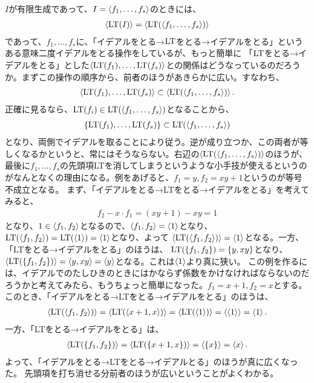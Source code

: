 \documentclass[9pt]{ltjsarticle}
\begin{document}
$I$が有限生成であって、$I=\gen{f_1,\dots,f_s}$のときには、
\begin{align}
  \gen{\LT(I)} = \gen{\LT(\gen{f_1,\dots,f_s})}
\end{align}
であって、$f_1,\dots,f_s$に、「イデアルをとる→$\LT$をとる→イデアルをとる」という
ある意味二度イデアルをとる操作をしているが、もっと簡単に
「$\LT$をとる→イデアルをとる」とした$\gen{\LT(f_1),\dots,\LT(f_s)}$との関係はどうなっているのだろうか。まずこの操作の順序から、前者のほうがあきらかに広い。すなわち、
\begin{align}
  \gen{\LT(f_1),\dots,\LT(f_s)} \subset \gen{\LT(\gen{f_1,\dots,f_s})}.
\end{align}
正確に見るなら、$\LT(f_i) \in \LT(\gen{f_1,\dots,f_s})$となることから、
\begin{align}
  \set{\LT(f_1),\dots,\LT(f_s)} \subset \LT(\gen{f_1,\dots,f_s})
\end{align}
となり、両側でイデアルを取ることにより従う。逆が成り立つか、この両者が等しくなるかというと、常にはそうならない。右辺の$\gen{\LT(\gen{f_1,\dots,f_s})}$のほうが、
最後に$f_1,\dots,f_s$の先頭項LTを消してしまうというような小手技が使えるというのがなんとなくの理由になる。例をあげると、$f_1 = y, f_2 = xy+1$というのが等号不成立となる。
まず、「イデアルをとる→LTをとる→イデアルをとる」を考えてみると、
\begin{align}
  f_2 - x\cdot f_1 = (xy+1) - xy = 1
\end{align}
となり、$1\in \gen{f_1, f_2}$となるので、$\gen{f_1,f_2} = \gen{1}$となり、
$\LT(\gen{f_1,f_2}) = \LT(\gen{1}) = \gen{1}$となり、よって
$\gen{\LT(\gen{f_1,f_2})} = \gen{1}$となる。一方、「LTをとる→イデアルをとる」のほうは、
$\LT(\set{f_1,f_2}) = \set{y,xy}$となり、$\gen{\LT(\set{f_1,f_2})} = \gen{y,xy} = \gen{y}$となる。これは$\gen{1}$より真に狭い。
この例を作るには、イデアルでのたしひきのときにはかならず係数をかけなければならないのだろうかと考えてみたら、もうちょっと簡単になった。$f_1 = x+1,f_2 = x$とする。
このとき、「イデアルをとる→LTをとる→イデアルをとる」のほうは、
\begin{align}
  \gen{\LT(\gen{f_1,f_2})} = \gen{\LT(\gen{x+1,x})}
  =
  \gen{\LT(\gen{1})}
  =
  \gen{\gen{1}}
  =
  \gen{1}.
\end{align}
一方、「LTをとる→イデアルをとる」は、
\begin{align}
  \gen{\LT(\set{f_1,f_2})}
  =
  \gen{\LT(\set{x+1,x})}
  =
  \gen{\set{x}}
  =
  \gen{x}.
\end{align}
よって、「イデアルをとる→LTをとる→イデアルとる」のほうが真に広くなった。
先頭項を打ち消せる分前者のほうが広いということがよくわかる。
\end{document}

